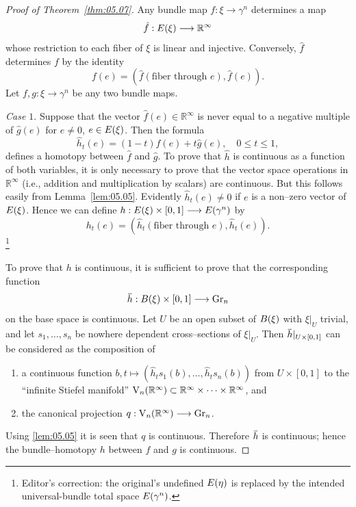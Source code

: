 \documentclass[../main]{subfiles}
\begin{document}
\begin{proof}[Proof of Theorem~\ref{thm:05.07}]
Any bundle map $f : \xi \longrightarrow \gamma^n$ determines a map \[\hat f : E(\xi) \longrightarrow {\mathbb R}^\infty\] whose restriction to each fiber of $\xi$ is linear and injective. Conversely, $\hat f$ determines $f$ by the identity \[f(e) = ({\hat f}(\text{fiber through } e), {\hat f}(e)).\] Let $f, g : \xi \longrightarrow \gamma^n$ be any two bundle maps. 

\emph{Case $1$}. Suppose that the vector ${\hat f}(e) \in {\mathbb R}^\infty$ is never equal to a negative multiple of ${\hat g}(e)$ for $e \ne 0$, $e \in E(\xi)$. Then the formula \[{\hat h}_t(e) = (1 - t) {\hat f}(e) + t {\hat g}(e), \quad 0 \le t \le 1,\] defines a homotopy between ${\hat f}$ and ${\hat g}$. To prove that $\hat h$ is continuous as a function of both variables, it is only necessary to prove that the vector space operations in ${\mathbb R}^\infty$ (i.e., addition and multiplication by scalars) are continuous. But this follows easily from Lemma~\ref{lem:05.05}. Evidently ${\hat h}_t(e) \ne 0$ if $e$ is a non--zero vector of $E(\xi)$. Hence we can define $h : E(\xi) \times [0, 1] \longrightarrow E(\gamma^n)$ by \[h_t(e) = ({\hat h}_t(\text{fiber through } e), {\hat h}_t(e)).\]\footnote{Editor's correction: the original's undefined $E(\eta)$ is replaced by the intended universal-bundle total space $E(\gamma^n)$.}

To prove that $h$ is continuous, it is sufficient to prove that the corresponding function \[\xoverline h : \base(\xi) \times [0, 1] \longrightarrow \grassmannian_n\] on the base space is continuous. Let $U$ be an open subset of $B(\xi)$ with $\xi |_U$ trivial, and let $s_1, \ldots, s_n$ be nowhere dependent cross--sections of $\xi |_U$. Then $\xoverline h |_{U \times [0,1]}$ can be considered as the composition of
\begin{enumerate}[label=\arabic*)]
    \item a continuous function $b, t \mapsto ({\hat h}_t s_1(b), \ldots, {\hat h}_t s_n(b))$ from $U \times [0, 1]$ to the ``infinite Stiefel manifold'' $\operatorname{V}_n({\mathbb R}^\infty) \subset {\mathbb R}^\infty \times \cdots \times {\mathbb R}^\infty$, and
    \item the canonical projection $q : \operatorname{V}_n({\mathbb R}^\infty) \longrightarrow \operatorname{Gr}_n$.
\end{enumerate} 
Using \ref{lem:05.05} it is seen that $q$ is continuous. Therefore $\xoverline h$ is continuous; hence the bundle--homotopy $h$ between $f$ and $g$ is continuous. 


\end{proof}
\end{document}
